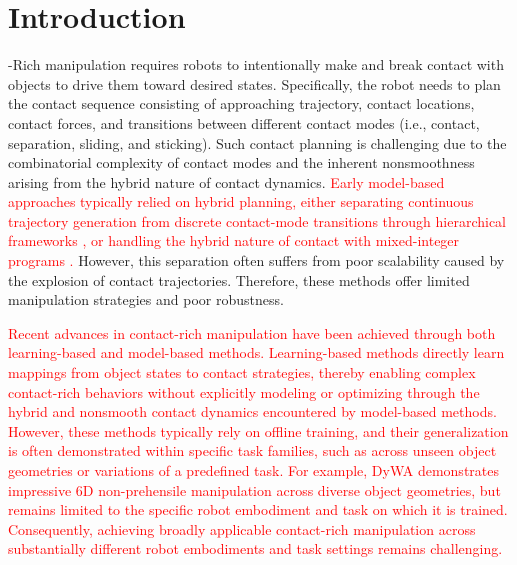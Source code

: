 \section{Introduction}
\label{sec:intro}

-Rich manipulation requires robots to intentionally make and break contact with objects to drive them toward desired states. Specifically, the robot needs to plan the contact sequence consisting of approaching trajectory, contact locations, contact forces, and transitions between different contact modes (i.e., contact, separation, sliding, and sticking). Such contact planning is challenging due to the combinatorial complexity of contact modes and the inherent nonsmoothness arising from the hybrid nature of contact dynamics. \textcolor{red}{Early model-based approaches typically relied on hybrid planning, either separating continuous trajectory generation from discrete contact-mode transitions through hierarchical frameworks \cite{zito2012two, wu2020r3t, haustein2015kinodynamic, chen2021trajectotree, cheng2022contact}, or handling the hybrid nature of contact with mixed-integer programs \cite{aceituno2020global, marcucci2017approximate, hogan2020feedback}.} However, this separation often suffers from poor scalability caused by the explosion of contact trajectories. Therefore, these methods offer limited manipulation strategies and poor robustness.

\textcolor{red}{
Recent advances in contact-rich manipulation have been achieved through both learning-based and model-based methods. Learning-based methods \cite{kim2023pre, lianglearning, zhou2023learning, zhang2023learning, zhou2023hacman, cho2024corn, jiang2024hacman++, le2025enhancing, lyu2025dywa} directly learn mappings from object states to contact strategies, thereby enabling complex contact-rich behaviors without explicitly modeling or optimizing through the hybrid and nonsmooth contact dynamics encountered by model-based methods. However, these methods typically rely on offline training, and their generalization is often demonstrated within specific task families, such as across unseen object geometries or variations of a predefined task. For example, DyWA \cite{lyu2025dywa} demonstrates impressive 6D non-prehensile manipulation across diverse object geometries, but remains limited to the specific robot embodiment and task on which it is trained. Consequently, achieving broadly applicable contact-rich manipulation across substantially different robot embodiments and task settings remains challenging.
}


